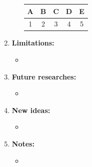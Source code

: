 \documentclass[11pt]{article}
\begin{document}
\begin{enumerate}
\begin{itemize}
\begin{table}[h]
\begin{center}
            \begin{tabular}{|c|c|c|c|c|}
                \hline
                A & B & C & D & E \\
                \hline
                \hline
                1 & 2 & 3 & 4 & 5 \\
                \hline
        
            \end{tabular}
            \end{center}
        \end{table}
    \end{itemize}
    
    \item
    \textbf{Limitations:}
    \begin{itemize}
        \item \blindtext[0]
    \end{itemize}
    
    \item
    \textbf{Future researches:}
    \begin{itemize}
        \item \blindtext[0]
    \end{itemize}
    
    \item
    \textbf{New ideas:}
    \begin{itemize}
        \item \blindtext[0]
    \end{itemize}
    
    \item
    \textbf{Notes:}
    \begin{itemize}
        \item \blindtext[0]
    \end{itemize}

         
\end{enumerate}
\end{document}
